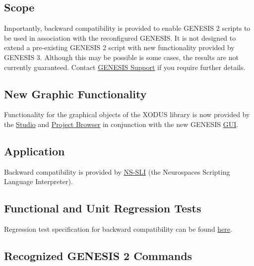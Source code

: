 \documentclass[12pt]{article}
\begin{document}
\subsection*{Scope}

Importantly, backward compatibility is provided to enable GENESIS 2 scripts to be used in association with the reconfigured GENESIS. It is not designed to extend a pre-existing GENESIS 2 script with new functionality provided by GENESIS 3. Although this may be possible is some cases, the results are not currently guaranteed. Contact \href{http://genesis-sim.org/contact}{GENESIS Support} if you require further details.

\subsection*{New Graphic Functionality}

Functionality for the graphical objects of the XODUS library is now provided by the \href{../studio/studio.tex}{Studio} and \href{../project-browser/project-browser.tex}{Project Browser} in conjunction with the new GENESIS \href{../gtube/gtube.tex}{GUI}.

\subsection*{Application}

Backward compatibility is provided by \href{../ns-sli/ns-sli.tex}{NS-SLI} (the Neurospaces Scripting Language Interpreter).

\subsection*{Functional and Unit Regression Tests}

Regression test specification for backward compatibility can be found \href{http://www.neurospaces.org/neurospaces_project/ns-sli/tests/html/index.html}{here}.

\subsection*{Recognized GENESIS 2 Commands}
\end{document}
